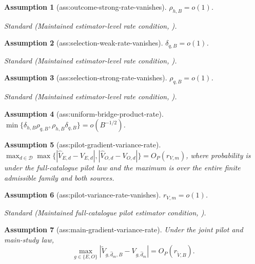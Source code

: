 \documentclass{article}
\newtheorem{assumption}{Assumption}
\begin{document}
\begin{assumption}[ass:outcome-strong-rate-vanishes]\label{ass:outcome-strong-rate-vanishes}
\(\rho_{h,B}=o(1)\).
\par\smallskip\noindent\emph{Standard} (Maintained estimator-level rate condition, \cite{ChernozhukovEtAl2018}).
\end{assumption}

\begin{assumption}[ass:selection-weak-rate-vanishes]\label{ass:selection-weak-rate-vanishes}
\(\delta_{q,B}=o(1)\).
\par\smallskip\noindent\emph{Standard} (Maintained estimator-level rate condition, \cite{ChernozhukovEtAl2018}).
\end{assumption}

\begin{assumption}[ass:selection-strong-rate-vanishes]\label{ass:selection-strong-rate-vanishes}
\(\rho_{q,B}=o(1)\).
\par\smallskip\noindent\emph{Standard} (Maintained estimator-level rate condition, \cite{ChernozhukovEtAl2018}).
\end{assumption}

\begin{assumption}[ass:uniform-bridge-product-rate]\label{ass:uniform-bridge-product-rate}
\(\min\{\delta_{h,B}\rho_{q,B},\rho_{h,B}\delta_{q,B}\}=o(B^{-1/2})\).
\end{assumption}

\begin{assumption}[ass:pilot-gradient-variance-rate]\label{ass:pilot-gradient-variance-rate}
\(\max_{d\in\mathcal D}\max\{|\widehat V_{E,d}-V_{E,d}|,|\widehat V_{O,d}-V_{O,d}|\}=O_P(r_{V,m})\), where probability is under the full-catalogue pilot law and the maximum is over the entire finite admissible family and both sources.
\end{assumption}

\begin{assumption}[ass:pilot-variance-rate-vanishes]\label{ass:pilot-variance-rate-vanishes}
\(r_{V,m}=o(1)\).
\par\smallskip\noindent\emph{Standard} (Maintained full-catalogue pilot estimator condition, \cite{ChernozhukovEtAl2018}).
\end{assumption}

\begin{assumption}[ass:main-gradient-variance-rate]\label{ass:main-gradient-variance-rate}
Under the joint pilot and main-study law,
\[
 \max_{g\in\{E,O\}}|\widetilde V_{g,\widehat d_m,B}-V_{g,\widehat d_m}|=O_P(r_{\widetilde V,B}).
\]
\end{assumption}
\end{document}

